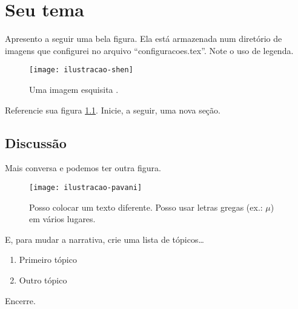 \pagestyle{fancy}

\chapter{Seu tema}
\label{cap4}

Apresento a seguir uma bela figura. Ela está armazenada num diretório de imagens
que configurei no arquivo ``configuracoes.tex''. Note o uso de legenda.

\begin{figure}[htbp]
	\centering
	\texttt{[image: ilustracao-shen]}
	\caption[Uma imagem esquisita \cite{opencvsite}.]{Uma imagem esquisita
	\cite{opencvsite}.}
	\label{fig:shen}
\end{figure}

Referencie sua figura \ref{fig:shen}. Inicie, a seguir, uma nova seção.

\section{Discussão}
\label{cap4:discussao}

Mais conversa e podemos ter outra figura.

\begin{figure}[htbp]
	\centering
	\texttt{[image: ilustracao-pavani]}
	\caption[Outra imagem estranha.]{Posso colocar um texto diferente. Posso
	usar letras gregas (ex.:  $\mu$) em vários lugares.}
	\label{fig:pavani}
\end{figure}

E, para mudar a narrativa, crie uma lista de tópicos\ldots

\begin{enumerate}
	\item Primeiro tópico
	\item Outro tópico
\end{enumerate}

Encerre.
